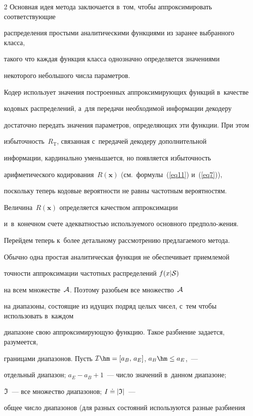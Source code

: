 \begin{multicols}{2}
Основная идея метода заключается в~том, чтобы аппроксимировать соответствующие 

распределения простыми аналитическими функциями из зара\-нее выбранного класса, 

такого что каждая функция класса однозначно определяется значениями 

некоторого небольшого числа параметров. 

Кодер использует значения построенных аппроксимирующих функций в~качестве 

кодовых распределений, а~для передачи необходимой информации декодеру 

достаточно передать значения параметров, определяющих эти функции. При этом 

избыточность~$R_{\mathrm{T}}$, связанная с~передачей декодеру дополнительной 

информации, кардинально уменьшается, но появляется избыточность 

арифметического кодирования~$R(\mathbf{x})$ (см.\ формулы~(\ref{eq11}) и~(\ref{eq7})), 

поскольку теперь кодовые вероятности не равны частотным вероятностям. 

Величина~$R(\mathbf{x})$ определяется качеством аппроксимации 

и~в~конечном счете адекватностью используемого основного предполо-\linebreak жения.



Перейдем теперь к~более детальному рассмотрению предлагаемого метода. 

Обычно одна простая аналитическая функция не обеспечивает приемлемой 

точ\-ности аппроксимации частотных распределений $f(x|{\cal S})$  

на всем множестве~${\cal A}$. Поэтому разобьем все множество~${\cal A}$ 

на диапазоны, состоящие из идущих подряд целых чисел, с~тем чтобы использовать в~каждом 

диапазоне свою аппроксимирующую функцию. Такое разбиение задается, разумеется, 

границами диапазонов. Пусть ${\cal I}\hm=[a_B,\,a_E]$, $a_B\hm\le a_E$,~--- 

отдельный диапазон; $a_E-a_B+1$~--- чис\-ло значений в~данном диапазоне; 

${\frak I}$~--- все множество диапазонов; $I\doteq |{\frak I}|$~--- 

общее число диапазонов (для разных состояний используются разные разбиения 


\end{multicols}
